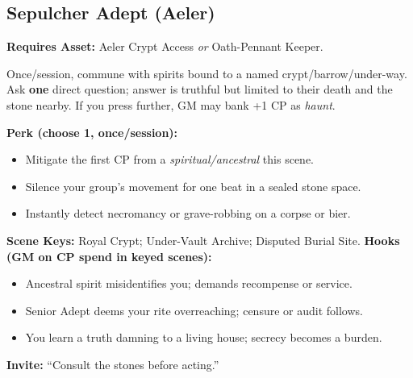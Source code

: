 \subsection{Sepulcher Adept (Aeler)}
\textbf{Requires Asset:} Aeler Crypt Access \emph{or} Oath-Pennant Keeper.
\begin{tcolorbox}[enhanced,sharp corners,boxrule=.6pt,title={Talent — Whisper of the Unquiet Dead (6 XP)}]
Once/session, commune with spirits bound to a named crypt/barrow/under-way. Ask \textbf{one} direct question; answer is truthful but limited to their death and the stone nearby. If you press further, GM may bank +1 CP as \emph{haunt}.
\end{tcolorbox}
\textbf{Perk (choose 1, once/session):}
\begin{itemize}
  \item Mitigate the first CP from a \emph{spiritual/ancestral} \SuitClub{} this scene.
  \item Silence your group's movement for one beat in a sealed stone space.
  \item Instantly detect necromancy or grave-robbing on a corpse or bier.
\end{itemize}
\textbf{Scene Keys:} Royal Crypt; Under-Vault Archive; Disputed Burial Site.
\textbf{Hooks (GM on CP spend in keyed scenes):}
\begin{itemize}
  \item Ancestral spirit misidentifies you; demands recompense or service.
  \item Senior Adept deems your rite overreaching; censure or audit follows.
  \item You learn a truth damning to a living house; secrecy becomes a burden.
\end{itemize}
\textbf{Invite:} “Consult the stones before acting.”

